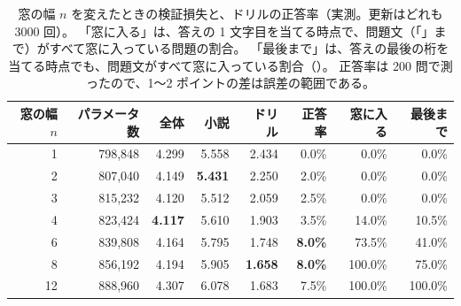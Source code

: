 \begin{table}[tbp]
\centering
\caption{窓の幅 $n$ を変えたときの検証損失と、ドリルの正答率（実測。更新はどれも 3000 回）。
「窓に入る」は、答えの 1 文字目を当てる時点で、問題文（「\code{=}」まで）がすべて窓に入っている問題の割合。
「最後まで」は、答えの最後の桁を当てる時点でも、問題文がすべて窓に入っている割合（）。
正答率は 200 問で測ったので、1〜2 ポイントの差は誤差の範囲である。}
\label{tab:emb-window}
\small
\begin{tabular}{rrrrrrrr}
\toprule
窓の幅 $n$ & パラメータ数 & 全体 & 小説 & ドリル & 正答率 & 窓に入る & 最後まで \\
\midrule
1 & 798,848 & 4.299 & 5.558 & 2.434 & 0.0\% & 0.0\% & 0.0\% \\
2 & 807,040 & 4.149 & \textbf{5.431} & 2.250 & 2.0\% & 0.0\% & 0.0\% \\
3 & 815,232 & 4.120 & 5.512 & 2.059 & 2.5\% & 0.0\% & 0.0\% \\
4 & 823,424 & \textbf{4.117} & 5.610 & 1.903 & 3.5\% & 14.0\% & 10.5\% \\
6 & 839,808 & 4.164 & 5.795 & 1.748 & \textbf{8.0\%} & 73.5\% & 41.0\% \\
8 & 856,192 & 4.194 & 5.905 & \textbf{1.658} & \textbf{8.0\%} & 100.0\% & 75.0\% \\
12 & 888,960 & 4.307 & 6.078 & 1.683 & 7.5\% & 100.0\% & 100.0\% \\
\bottomrule
\end{tabular}
\end{table}

